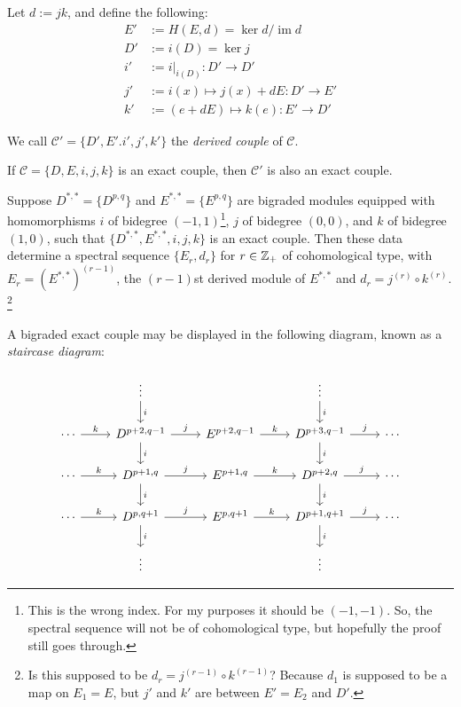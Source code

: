 \documentclass{MetricNotes2023}
\def\inte{\ensuremath\mathbb{Z}}
\DeclareMathOperator{\im}{im}
\begin{document}
Let \(d:=jk\), and define the following:
\begin{align*}
E'&:=H(E, d)=\ker d/\im d\\
D'&:=i(D)=\ker j\\
i'&:=i|_{i(D)} : D'\to D'\\
j'&:=i(x)\mapsto j(x)+dE : D'\to E'\\
k'&:=(e+dE)\mapsto k(e) : E' \to D'
\end{align*}

We call \(\mathcal{C}'=\{D', E'. i', j', k'\}\) the \textit{derived couple} of \(\mathcal{C}\). 

\begin{proposition}
If \(\mathcal{C}=\{D, E, i, j, k\}\) is an exact couple, then \(\mathcal{C}'\) is also an exact couple.
\end{proposition}

\begin{theorem}\label{2503301131}
Suppose \(D^{*,*}=\{D^{p,q}\}\) and \(E^{*,*}=\{E^{p,q}\}\) are bigraded modules equipped with homomorphisms \(i\) of bidegree \((-1,1)\)\footnote{This is the wrong index. For my purposes it should be \((-1, -1)\). So, the spectral sequence will not be of cohomological type, but hopefully the proof still goes through.}, \(j\) of bidegree \((0,0)\), and \(k\) of bidegree \((1,0)\), such that \(\{D^{*,*}, E^{*,*}, i, j, k\}\) is an exact couple. Then these data determine a spectral sequence \(\{E_r, d_r\}\) for \(r\in \inte_+\) of cohomological type, with \(E_r=(E^{*,*})^{(r-1)}\), the \((r-1)\)st derived module of \(E^{*,*}\) and \(d_r=j^{(r)}\circ k^{(r)}\). \footnote{Is this supposed to be \(d_r = j^{(r-1)}\circ k^{(r-1)}\)? Because \(d_1\) is supposed to be a map on \(E_1=E\), but \(j'\) and \(k'\) are between \(E'=E_2\) and \(D'\).}
\end{theorem}

A bigraded exact couple may be displayed in the following diagram, known as a \textit{staircase diagram}:

\[\begin{tikzcd} 
   &  \vdots \arrow[d, "i"] &  & \vdots \arrow[d, "i"] & \\
 \cdots \arrow[r, "k"] & D^{p+2, q-1} \arrow[d, "i"] \arrow[r, "j"] & E^{p+2,q-1}  \arrow[r, "k"] & D^{p+3,q-1} \arrow[d, "i"] \arrow[r, "j"] & \cdots \\
 \cdots \arrow[r, "k"] & D^{p+1,q} \arrow[d, "i"] \arrow[r, "j"] & E^{p+1,q}  \arrow[r, "k"] & D^{p+2,q} \arrow[d, "i"] \arrow[r, "j"] & \cdots \\
 \cdots \arrow[r, "k"] & D^{p,q+1}  \arrow[d, "i"] \arrow[r, "j"] & E^{p,q+1}  \arrow[r, "k"] & D^{p+1,q+1} \arrow[d, "i"] \arrow[r, "j"] & \cdots \\
 & \vdots &  & \vdots & 
\end{tikzcd}\]
\end{document}
